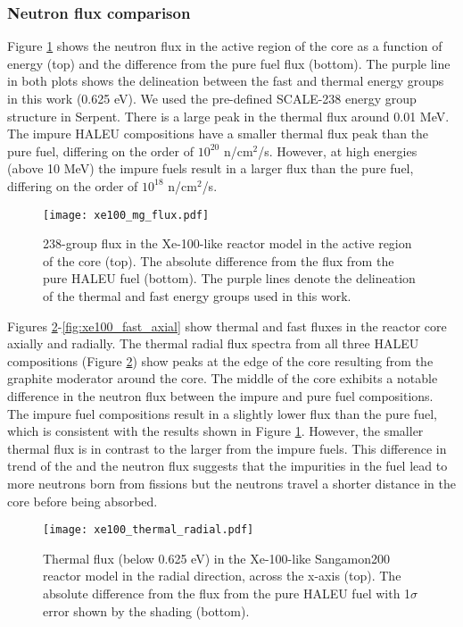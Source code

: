 \subsubsection{Neutron flux comparison}
Figure \ref{fig:xe100_mg_flux} shows the neutron flux in the 
active region of the core as a function of energy (top) and 
the difference from the pure fuel flux (bottom). The purple 
line in both plots shows the delineation between the fast 
and thermal energy groups in this work (0.625 eV). We used the pre-defined 
SCALE-238 energy group structure in Serpent. 
There is a large peak in the thermal flux around 0.01 MeV. The impure 
\gls{HALEU} compositions have a smaller thermal flux peak 
than the pure fuel, differing on the order of $10^{20}$ 
n/cm$^2$/s. However, at high energies (above 10
MeV) the impure fuels result in a larger flux than the pure 
fuel, differing on the order of $10^{18}$ n/cm$^2$/s. 

\begin{figure}[ht]
        \centering 
        \texttt{[image: xe100\_mg\_flux.pdf]}
        \caption{238-group flux in the Xe-100-like 
        reactor model in the active region of the core (top). 
        The absolute difference from the flux from 
        the pure \gls{HALEU} fuel (bottom). The purple lines 
        denote the delineation of the thermal and fast 
        energy groups used in this work.}
        \label{fig:xe100_mg_flux}
\end{figure}

Figures \ref{fig:xe100_thermal_radial}-\ref{fig:xe100_fast_axial} show 
thermal and fast fluxes in the reactor core axially and radially. 
The thermal radial flux spectra from all three \gls{HALEU} compositions 
(Figure \ref{fig:xe100_thermal_radial})
show peaks at the edge of the core resulting from the graphite moderator 
around the core. The middle of the core exhibits a notable 
difference in the neutron flux between the impure and pure fuel 
compositions. The impure fuel compositions result in a slightly 
lower flux than the pure fuel, which is consistent with the 
results shown in Figure \ref{fig:xe100_mg_flux}. 
However, the smaller thermal flux is in contrast to the larger 
\keff from the impure fuels. This difference in trend of the \keff and 
the neutron flux suggests that the impurities in the fuel lead to 
more neutrons born from fissions but the neutrons travel a shorter 
distance in the core before being absorbed. 

\begin{figure}[ht]
        \centering 
        \texttt{[image: xe100\_thermal\_radial.pdf]}
        \caption{Thermal flux (below 0.625 eV) in the Xe-100-like Sangamon200 
        reactor model in the radial direction, across the 
        x-axis (top). The absolute difference from the flux from 
        the pure \gls{HALEU} fuel with 1$\sigma$ error shown by 
        the shading (bottom).}
        \label{fig:xe100_thermal_radial}
\end{figure}

